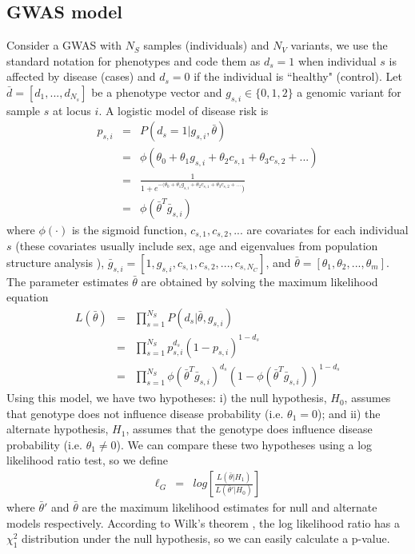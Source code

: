 \subsection{GWAS model}

Consider a GWAS with $N_S$  samples (individuals) and $N_V$ variants, we use the standard notation for phenotypes and code them as $d_s=1$ when individual $s$ is affected by disease (cases) and $d_s=0$ if the individual is ``healthy" (control). 
Let $\bar{d} = [d_1, ..., d_{N_s}]$ be a phenotype vector and $g_{s,i} \in \{0,1,2\}$ a genomic variant for sample $s$ at locus $i$. A logistic model of disease risk \cite{balding2006tutorial} is
\begin{eqnarray*}
    p_{s,i} & = & P( d_s=1 | g_{s,i}, \bar{\theta} ) \\
    & = & \phi( \theta_0 + \theta_1 g_{s,i} + \theta_2 c_{s,1} + \theta_3 c_{s,2} + ... ) \\
    & = & \frac{1}{1 + e^{-(\theta_0 + \theta_1 g_{s,i} + \theta_2 c_{s,1} + \theta_3 c_{s,2} + ...})} \\
    & = & \phi( \bar{\theta}^T \bar{g}_{s,i})
\end{eqnarray*}
\noindent where $\phi(\cdot)$ is the sigmoid function, $c_{s,1}, c_{s,2}, ... $ are covariates for each individual $s$ (these covariates usually include sex, age and eigenvalues from population structure analysis \cite{price2006principal}), $\bar{g}_{s,i} = [ 1, g_{s,i} , c_{s,1}, c_{s,2}, ... , c_{s,N_C} ]$, and $\bar{\theta} = [\theta_1, \theta_2, ..., \theta_m] $. 
The parameter estimates $\bar{\theta}$ are obtained by solving the maximum likelihood equation
\begin{eqnarray*}
    L( \bar{\theta} ) & = & \prod_{s=1}^{N_S}{ P( d_s | \bar{\theta}, g_{s,i} ) } \\
    & = & \prod_{s=1}^{N_S}{ p_{s,i}^{d_s} (1-p_{s,i})^{1-d_s} } \\
    & = & \prod_{s=1}^{N_S}{ \phi( \bar{\theta}^T \bar{g}_{s,i})^{d_s} (1-\phi( \bar{\theta}^T \bar{g}_{s,i}))^{1-d_s} }
\end{eqnarray*}
Using this model, we have two hypotheses: 
i) the null hypothesis, $H_0$, assumes that genotype does not influence disease probability (i.e. $\theta_1 = 0$); and
ii) the alternate hypothesis, $H_1$, assumes that the genotype does influence disease probability (i.e. $\theta_1 \neq 0$). 
We can compare these two hypotheses using a log likelihood ratio test, so we define
\begin{eqnarray*} \label{eq:gwasLogLikLogReg}
	\ell_G & = & log \left[ \frac{L( \bar{\theta} | H_1 ) }{ L( \bar{\theta}' | H_0 ) } \right]
\end{eqnarray*}
\noindent where $\bar{\theta}'$ and $\bar{\theta}$ are the maximum likelihood estimates for null and alternate models respectively. 
According to Wilk's theorem \cite{wilks1938large}, the log likelihood ratio has a $\chi^2_1$ distribution under the null hypothesis, so we can easily calculate a p-value.

